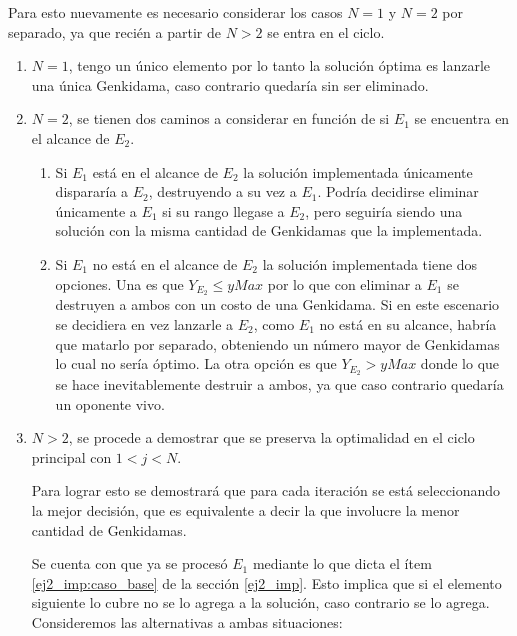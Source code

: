 	Para esto nuevamente es necesario considerar los casos $N = 1$ y $N = 2$ por
	separado, ya que recién a partir de $N > 2$ se entra en el ciclo.
	\begin{enumerate}
		\item{
			$N = 1$, tengo un único elemento por lo tanto la solución óptima es
			lanzarle una única Genkidama, caso contrario quedaría sin ser
			eliminado.
		}
		\item{
			$N = 2$, se tienen dos caminos a considerar en función de si
			$E_1$ se encuentra en el alcance de $E_2$.
			\begin{enumerate}
				\item{
					Si $E_1$ está en el alcance de $E_2$ la solución
					implementada únicamente dispararía a $E_2$, destruyendo a su
					vez a $E_1$. Podría decidirse eliminar únicamente a $E_1$ si su rango
					llegase a $E_2$, pero seguiría siendo una solución con la
					misma cantidad de Genkidamas que la implementada.
				}
				\item{
					Si $E_1$ no está en el alcance de $E_2$ la solución
					implementada tiene dos opciones. Una es que $Y_{E_2} \leq
					yMax$ por lo que con eliminar a $E_1$ se destruyen a ambos
					con un costo de una Genkidama. Si en este escenario se
					decidiera en vez lanzarle a $E_2$, como $E_1$ no está en su
					alcance, habría que matarlo por separado, obteniendo un
					número mayor de Genkidamas lo cual no sería óptimo. La otra
					opción es que $Y_{E_2} > yMax$ donde lo que se hace
					inevitablemente destruir a ambos, ya que caso contrario
					quedaría un oponente vivo.
				}
			\end{enumerate}
		}
		\item{
			$N > 2$, se procede a demostrar que se preserva la optimalidad en el ciclo principal
			con $1 < j < N$.

			Para lograr esto se demostrará que para cada iteración se está
			seleccionando la mejor decisión, que es equivalente a decir la que
			involucre la menor cantidad de Genkidamas.


			Se cuenta con que ya se procesó $E_1$ mediante lo que dicta el ítem
			\ref{ej2_imp:caso_base} de la sección \ref{ej2_imp}. Esto implica
			que si el elemento siguiente lo cubre no se lo agrega a la solución,
			caso contrario se lo agrega. Consideremos las alternativas a ambas
			situaciones:

}
\end{enumerate}
